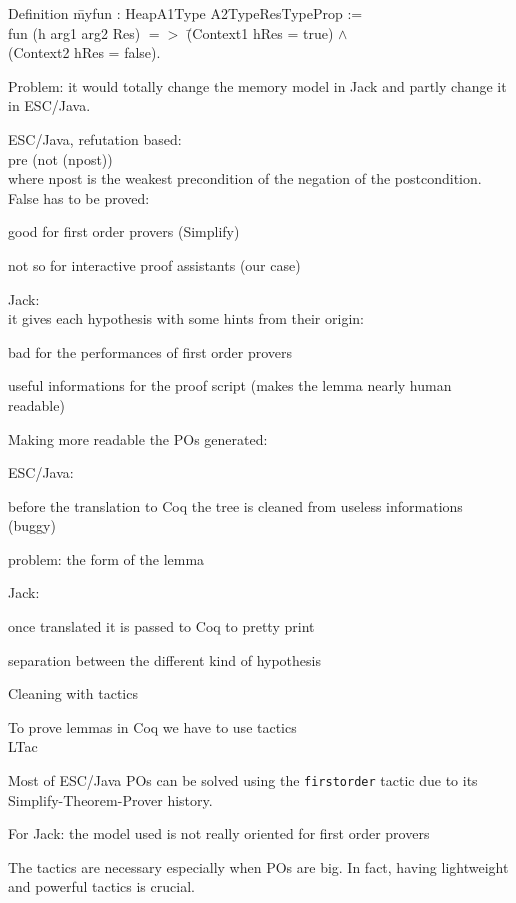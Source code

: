 \begin{tabbing}
{\purple Definition} \= myfun : Heap\rarrow A1Type\rarrow 
A2Type\rarrow ResType\rarrow Prop := \\\>
{\purple fun} (h arg1 arg2 Res) {\purple $=>$} \= (Context1 h\rarrow Res = true) $\wedge$\\
\>\> (Context2 h\rarrow Res = false).
\end{tabbing}
\blist
\item Problem: it would totally change the memory model in Jack and 
partly change it in ESC/Java.
\elist


\blist
\item ESC/Java, {\purple refutation} based: \\\small
pre \rarrow (not (npost)) \\
where npost is the weakest precondition of the negation of the postcondition.
False has to be proved:
\blist \item  good for first order provers (Simplify) 
\item not so for
interactive proof assistants (our case)
\elist
\norm
\item Jack:\\ 
\small
it gives each hypothesis with some {\purple hints} from their origin:
\blist 
\item bad for the performances of first order provers
\item useful informations for the proof script (makes the lemma
nearly human readable)
\elist
\elist


Making more readable the POs generated:
\blist
\item ESC/Java: 
\blist \small
\item before the translation to Coq the tree is cleaned from useless 
informations ({\purple buggy})
\item problem: the form of the lemma
\elist
\item Jack:
\blist \small
\item once translated it is passed to Coq  to {\purple pretty print}
\item separation between the different kind of hypothesis
\elist 
\item Cleaning with tactics
\elist
{}

To prove lemmas in Coq we have to use tactics \\
\rarrow LTac
\blist \small
\item
Most of ESC/Java POs can be solved using the {\tt firstorder} tactic due
to its Simplify-Theorem-Prover history.
\item
For Jack: the model used is not really oriented for
first order provers
\item The tactics are necessary especially when POs are big.
\elist
In fact, having {\purple lightweight} and {\purple powerful} 
tactics is crucial.

